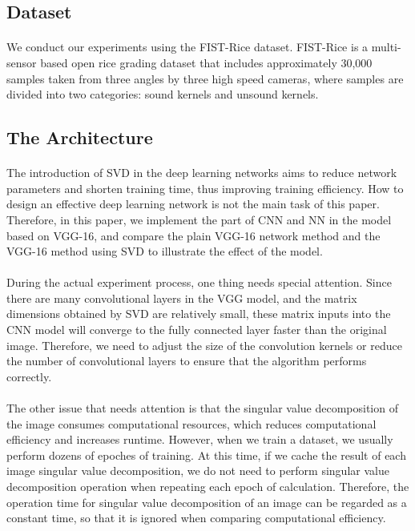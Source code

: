 \documentclass[12pt,a4paper]{article}
\begin{document}
\subsection{Dataset}
\paragraph{} We conduct our experiments using the FIST-Rice dataset. FIST-Rice is a multi-sensor based open rice grading dataset that includes approximately 30,000 samples taken from three angles by three high speed cameras, where samples are divided into two categories: sound kernels and unsound kernels.
\subsection{The Architecture}
\paragraph{} The introduction of SVD in the deep learning networks aims to reduce network parameters and shorten training time, thus improving training efficiency. How to design an effective deep learning network is not the main task of this paper. Therefore, in this paper, we implement the part of CNN and NN in the model based on VGG-16\cite{vgg}, and compare the plain VGG-16 network method and the VGG-16 method using SVD to illustrate the effect of the model.
\paragraph{} During the actual experiment process, one thing needs special attention. Since there are many convolutional layers in the VGG model, and the matrix dimensions obtained by SVD are relatively small, these matrix inputs into the CNN model will converge to the fully connected layer faster than the original image. Therefore, we need to adjust the size of the convolution kernels or reduce the number of convolutional layers to ensure that the algorithm performs correctly.
\paragraph{} The other issue that needs attention is that the singular value decomposition of the image consumes computational resources, which reduces computational efficiency and increases runtime. However, when we train a dataset, we usually perform dozens of epoches of training. At this time, if we cache the result of each image singular value decomposition, we do not need to perform singular value decomposition operation when repeating each epoch of calculation. Therefore, the operation time for singular value decomposition of an image can be regarded as a constant time, so that it is ignored when comparing computational efficiency.
\end{document}
